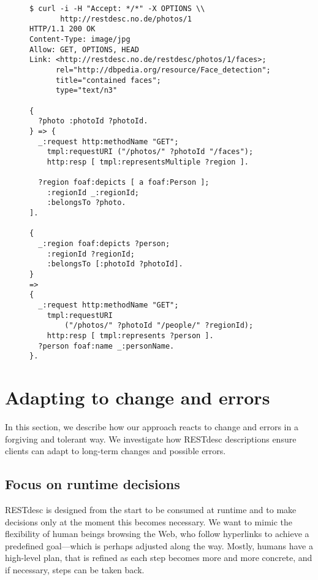 \documentclass[runningheads,a4paper, twocolumn]{llncs}
\begin{document}
\begin{figure}[float=h!]
\begin{lstlisting}[caption=An OPTIONS call to find out about ones options with a concrete photo, label=lst:PhotoOPTIONS, escapechar=§]
$ curl -i -H "Accept: */*" -X OPTIONS \\
       http://restdesc.no.de/photos/1
HTTP/1.1 200 OK
Content-Type: image/jpg
Allow: GET, OPTIONS, HEAD
Link: <http://restdesc.no.de/restdesc/photos/1/faces>;
      rel="http://dbpedia.org/resource/Face_detection";
      title="contained faces";
      type="text/n3"

{
  ?photo :photoId ?photoId.
} => {
  _:request http:methodName "GET";
    tmpl:requestURI ("/photos/" ?photoId "/faces");
    http:resp [ tmpl:representsMultiple ?region ].
    
  ?region foaf:depicts [ a foaf:Person ];
    :regionId _:regionId;
    :belongsTo ?photo.    
].

{
  _:region foaf:depicts ?person;
    :regionId ?regionId;
    :belongsTo [:photoId ?photoId].
}
=>
{
  _:request http:methodName "GET";
    tmpl:requestURI
        ("/photos/" ?photoId "/people/" ?regionId);
    http:resp [ tmpl:represents ?person ].
  ?person foaf:name _:personName.
}.
\end{lstlisting}
\end{figure}


\section{Adapting to change and errors} \label{sec:adapting-to-change-and-errors}
In this section, we describe how our approach reacts to change and errors in a forgiving and tolerant way. We investigate how RESTdesc descriptions ensure clients can adapt to long-term changes and possible errors.

\subsection{Focus on runtime decisions}
RESTdesc is designed from the start to be consumed at runtime and to make decisions only at the moment this becomes necessary. We want to mimic the flexibility of human beings browsing the Web, who follow hyperlinks to achieve a predefined goal---which is perhaps adjusted along the way. Mostly, humans have a high-level plan, that is refined as each step becomes more and more concrete, and if necessary, steps can be taken back.
\end{document}
